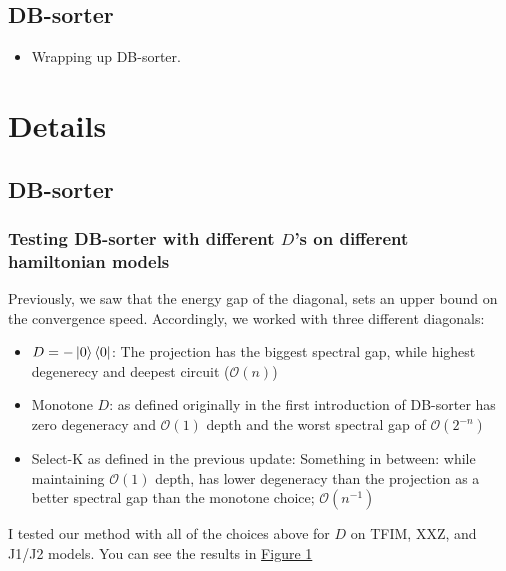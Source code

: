 \documentclass[11pt]{article}
\begin{document}
\subsection{DB-sorter}
\begin{itemize}
    \item Wrapping up DB-sorter.
\end{itemize}


\section{Details}
\subsection{DB-sorter}
\subsubsection{Testing DB-sorter with different $D$'s on different hamiltonian models}
\label{sec:simulation-runs}
Previously, we saw that the energy gap of the diagonal, sets an upper bound on the convergence speed. Accordingly, we worked with three different diagonals:
\begin{itemize}
    \item $D=-\ket{0}\bra{0}$: The projection has the biggest spectral gap, while highest degenerecy and deepest circuit ($\mathcal{O}(n)$)
    \item Monotone $D$: as defined originally in the first introduction of DB-sorter has zero degeneracy and $\mathcal{O}(1)$ depth and the worst spectral gap of $\mathcal{O}(2^{-n})$
    \item Select-K as defined in the previous update: Something in between: while maintaining $\mathcal{O}(1)$ depth, has lower degeneracy than the projection as a better spectral gap than the monotone choice; $\mathcal{O}(n^{-1})$ 
\end{itemize}

I tested our method with all of the choices above for $D$ on TFIM, XXZ, and J1/J2 models. You can see the results in \hyperref[fig:model-comparison]{Figure 1}
\end{document}
